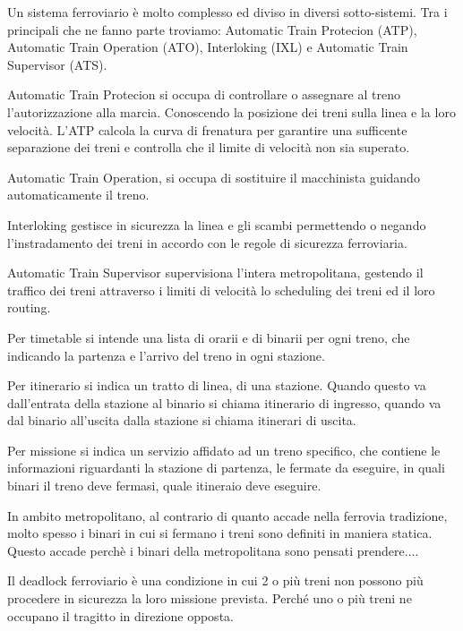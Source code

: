 \documentclass{ewic}
\begin{document}
Un sistema ferroviario è molto complesso ed diviso in diversi sotto-sistemi.
Tra i principali che ne fanno parte troviamo: Automatic Train Protecion (ATP), Automatic Train Operation (ATO), Interloking (IXL) e Automatic Train Supervisor (ATS).

 Automatic Train Protecion  si occupa di controllare o assegnare al treno l'autorizzazione alla marcia. Conoscendo la posizione dei treni sulla linea e la loro velocità. L'ATP calcola la curva di frenatura per garantire una sufficente separazione dei treni e controlla che il limite di velocità non sia superato. 
 
 Automatic Train Operation, si occupa di sostituire il macchinista guidando automaticamente il treno.
  
 Interloking gestisce in sicurezza la linea e gli scambi permettendo o negando l'instradamento dei treni in accordo con le regole di sicurezza ferroviaria.
  
 Automatic Train Supervisor  supervisiona l'intera metropolitana, gestendo il traffico dei treni attraverso i limiti di velocità lo scheduling dei treni ed il loro routing.

Per timetable si intende una lista di orarii e di binarii per ogni treno, che indicando la partenza e l'arrivo del treno in ogni stazione.

Per itinerario si indica un tratto di linea, di una stazione. Quando questo va dall'entrata della stazione al binario si chiama itinerario di ingresso, quando va dal binario all'uscita dalla stazione si chiama itinerari di uscita.

Per missione si indica un servizio affidato ad un treno specifico, che contiene le informazioni riguardanti la stazione di partenza, le fermate da eseguire, in quali binari il treno deve fermasi, quale itineraio deve eseguire.
 
In ambito metropolitano, al contrario di quanto accade nella ferrovia tradizione, molto spesso i binari in cui si fermano i treni sono definiti in maniera statica. Questo accade perchè i binari della metropolitana sono pensati prendere....

Il deadlock ferroviario è una condizione in cui 2 o più treni non possono più procedere in sicurezza la loro missione prevista. Perché uno o più treni ne occupano il tragitto in direzione opposta.
 
\end{document}
